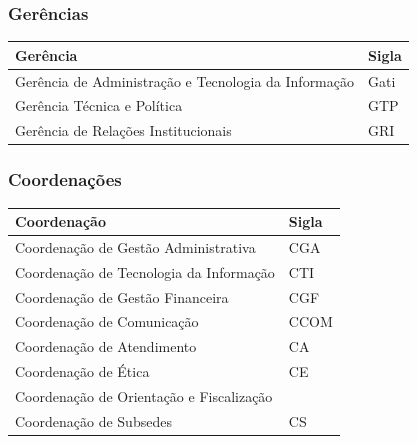 \subsubsection{Gerências}

\begin{longtable}[]{@{}
  >{\centering\arraybackslash}p{}
  >{\centering\arraybackslash}p{}@{}}
  \toprule\noalign{}
  \begin{minipage}[b]{\linewidth}\centering
    \textbf{Gerência}
  \end{minipage}            & \begin{minipage}[b]{\linewidth}\centering
                                \textbf{Sigla}
                              \end{minipage} \\
  \midrule\noalign{}
  \endhead
  \bottomrule\noalign{}
  \endlastfoot
  Gerência de Administração e Tecnologia da Informação & Gati          \\
  Gerência Técnica e Política                          & GTP           \\
  Gerência de Relações Institucionais                  & GRI           \\
\end{longtable}

\subsubsection{Coordenações}

\begin{longtable}[]{@{}
  >{\centering\arraybackslash}p{}
  >{\centering\arraybackslash}p{}@{}}
  \toprule\noalign{}
  \begin{minipage}[b]{\linewidth}\centering
    \textbf{Coordenação}
  \end{minipage} & \begin{minipage}[b]{\linewidth}\centering
                     \textbf{Sigla}
                   \end{minipage} \\
  \midrule\noalign{}
  \endhead
  \bottomrule\noalign{}
  \endlastfoot
  Coordenação de Gestão Administrativa      & CGA           \\
  Coordenação de Tecnologia da Informação   & CTI           \\
  Coordenação de Gestão Financeira          & CGF           \\
  Coordenação de Comunicação                & CCOM          \\
  Coordenação de Atendimento                & CA            \\
  Coordenação de Ética                      & CE            \\
  Coordenação de Orientação e Fiscalização  &               \\
  Coordenação de Subsedes                   & CS            \\
\end{longtable}

